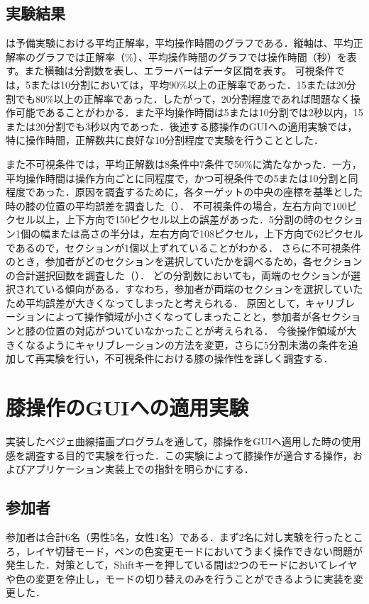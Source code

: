 \documentclass[submit, techrep]{ipsj}
\begin{document}
\subsection{実験結果}
は予備実験における平均正解率，平均操作時間のグラフである．縦軸は、平均正解率のグラフでは正解率（$\%$）、平均操作時間のグラフでは操作時間（秒）を表す。また横軸は分割数を表し、エラーバーはデータ区間を表す。
可視条件では，5または10分割においては，平均90\%以上の正解率であった．15または20分割でも80\%以上の正解率であった．したがって，20分割程度であれば問題なく操作可能であることがわかる．また平均操作時間は5または10分割では2秒以内，15または20分割でも3秒以内であった．後述する膝操作のGUIへの適用実験では，特に操作時間，正解数共に良好な10分割程度で実験を行うこととした．
\par
また不可視条件では，平均正解数は8条件中7条件で50\%に満たなかった．一方，平均操作時間は操作方向ごとに同程度で，かつ可視条件での5または10分割と同程度であった．原因を調査するために，各ターゲットの中央の座標を基準とした時の膝の位置の平均誤差を調査した（）．
不可視条件の場合，左右方向で100ピクセル以上，上下方向で150ピクセル以上の誤差があった．5分割の時のセクション1個の幅または高さの半分は，左右方向で108ピクセル，上下方向で62ピクセルであるので，セクションが1個以上ずれていることがわかる．
さらに不可視条件のとき，参加者がどのセクションを選択していたかを調べるため，各セクションの合計選択回数を調査した（）．
どの分割数においても，両端のセクションが選択されている傾向がある．すなわち，参加者が両端のセクションを選択していたため平均誤差が大きくなってしまったと考えられる．
原因として，キャリブレーションによって操作領域が小さくなってしまったことと，参加者が各セクションと膝の位置の対応がついていなかったことが考えられる．
今後操作領域が大きくなるようにキャリブレーションの方法を変更，さらに5分割未満の条件を追加して再実験を行い，不可視条件における膝の操作性を詳しく調査する．
\section{膝操作のGUIへの適用実験}
実装したベジェ曲線描画プログラムを通して，膝操作をGUIへ適用した時の使用感を調査する目的で実験を行った．この実験によって膝操作が適合する操作，およびアプリケーション実装上での指針を明らかにする．
\subsection{参加者}
参加者は合計6名（男性5名，女性1名）である．まず2名に対し実験を行ったところ，レイヤ切替モード，ペンの色変更モードにおいてうまく操作できない問題が発生した．対策として，Shiftキーを押している間は2つのモードにおいてレイヤや色の変更を停止し，モードの切り替えのみを行うことができるように実装を変更した．
\end{document}
